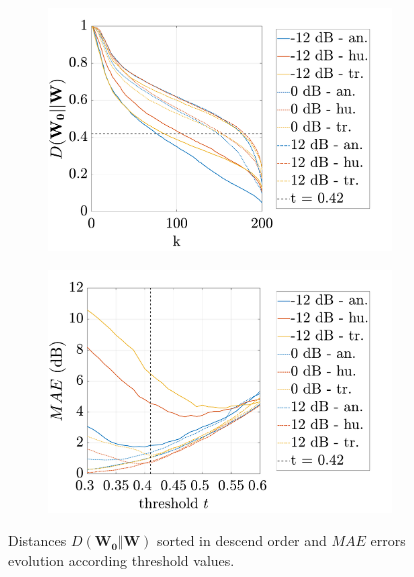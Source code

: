\documentclass[12pt,english,twoside]{article}
\begin{document}
\begin{figure}
\centering
\begin{subfigure}{.5\textwidth}
  \centering
  \includegraphics[width=.9\linewidth]{figures/distance_D_ICSV.pdf}
  \caption{ }
  \label{fig:distance_D}
\end{subfigure}%
\begin{subfigure}{.5\textwidth}
  \centering
  \includegraphics[width=.9\linewidth]{figures/error_mae_amb.pdf}
  \caption{}
  \label{fig:mae_threshold}
\end{subfigure}
\caption{Distances $D(\mathbf{W_0}\Vert \mathbf{W})$ sorted in descend order and $MAE$ errors evolution according threshold values.}
\label{fig:D_threshold}
\end{figure}
\end{document}
